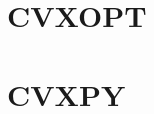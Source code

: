 \documentclass[a4paper,12pt]{report}
\begin{document}


    



    








\section{CVXOPT}
\section{CVXPY}
\end{document}
